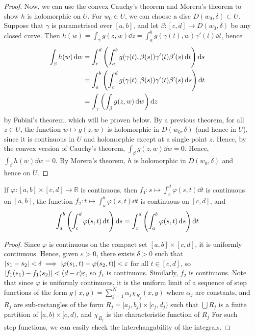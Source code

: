 \begin{proof}
	Now, we can use the convex Cauchy's theorem and Morera's theorem to show \( h \) is holomorphic on \( U \).
	For \( w_0 \in U \), we can choose a disc \( D(w_0, \delta) \subset U \).
	Suppose that \( \gamma \) is parametrised over \( [a,b] \), and let \( \beta \colon [c,d] \to D(w_0,\delta) \) be any closed curve.
	Then \( h(w) = \int_\gamma g(z,w) \dd{z} = \int_a^b g(\gamma(t),w) \gamma'(t) \dd{t} \), hence
	\begin{align*}
		\int_\beta h(w) \dd{w} & = \int_c^d \qty(\int_a^b g(\gamma(t),\beta(s))\gamma'(t)\beta'(s) \dd{t})\dd{s} \\
		                       & = \int_a^b \qty(\int_c^d g(\gamma(t),\beta(s))\gamma'(t)\beta'(s) \dd{s})\dd{t} \\
		                       & = \int_\gamma \qty(\int_\beta g(z,w) \dd{w}) \dd{z}
	\end{align*}
	by Fubini's theorem, which will be proven below.
	By a previous theorem, for all \( z \in U \), the function \( w \mapsto g(z,w) \) is holomorphic in \( D(w_0, \delta) \) (and hence in \( U \)), since it is continuous in \( U \) and holomorphic except at a single point \( z \).
	Hence, by the convex version of Cauchy's theorem, \( \int_\beta g(z,w) \dd{w} = 0 \).
	Hence, \( \int_\beta h(w) \dd{w} = 0 \).
	By Morera's theorem, \( h \) is holomorphic in \( D(w_0, \delta) \) and hence on \( U \).
\end{proof}
\begin{lemma}
	If \( \varphi \colon [a,b] \times [c,d] \to \mathbb R \) is continuous, then \( f_1 \colon s \mapsto \int_c^d \varphi(s,t) \dd{t} \) is continuous on \( [a,b] \), the function \( f_2 \colon t \mapsto \int_a^b \varphi(s,t) \dd{t} \) is continuous on \( [c,d] \), and
	\[
		\int_a^b \qty( \int_c^d \varphi(s,t) \dd{t} ) \dd{s} = \int_c^d \qty( \int_a^b \varphi(s,t) \dd{s} ) \dd{t}
	\]
\end{lemma}
\begin{proof}
	Since \( \varphi \) is continuous on the compact set \( [a,b] \times [c,d] \), it is uniformly continuous.
	Hence, given \( \varepsilon > 0 \), there exists \( \delta > 0 \) such that \( \abs{s_1 - s_2} < \delta \implies \abs{\varphi(s_1, t) - \varphi(s_2, t)} < \varepsilon \) for all \( t \in [c,d] \), so \( \abs{f_1(s_1) - f_1(s_2)} < (d-c) \varepsilon \), so \( f_1 \) is continuous.
	Similarly, \( f_2 \) is continuous.
	Note that since \( \varphi \) is uniformly continuous, it is the uniform limit of a sequence of step functions of the form \( g(x,y) = \sum_{j=1}^N \alpha_j \chi_{R_j}(x,y) \) where \( \alpha_j \) are constants, and \( R_j \) are sub-rectangles of the form \( R_j = [a_j, b_j) \times [c_j, d_j) \) such that \( \bigcup R_j \) is a finite partition of \( [a,b) \times [c,d) \), and \( \chi_{R_j} \) is the characteristic function of \( R_j \)
	For such step functions, we can easily check the interchangability of the integrals.
\end{proof}

